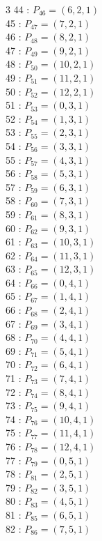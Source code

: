 \documentclass{article}
\begin{document}
{\begin{multicols}{3}
44 : $P_{46}=( 6, 2, 1 )$\\
45 : $P_{47}=( 7, 2, 1 )$\\
46 : $P_{48}=( 8, 2, 1 )$\\
47 : $P_{49}=( 9, 2, 1 )$\\
48 : $P_{50}=( 10, 2, 1 )$\\
49 : $P_{51}=( 11, 2, 1 )$\\
50 : $P_{52}=( 12, 2, 1 )$\\
51 : $P_{53}=( 0, 3, 1 )$\\
52 : $P_{54}=( 1, 3, 1 )$\\
53 : $P_{55}=( 2, 3, 1 )$\\
54 : $P_{56}=( 3, 3, 1 )$\\
55 : $P_{57}=( 4, 3, 1 )$\\
56 : $P_{58}=( 5, 3, 1 )$\\
57 : $P_{59}=( 6, 3, 1 )$\\
58 : $P_{60}=( 7, 3, 1 )$\\
59 : $P_{61}=( 8, 3, 1 )$\\
60 : $P_{62}=( 9, 3, 1 )$\\
61 : $P_{63}=( 10, 3, 1 )$\\
62 : $P_{64}=( 11, 3, 1 )$\\
63 : $P_{65}=( 12, 3, 1 )$\\
64 : $P_{66}=( 0, 4, 1 )$\\
65 : $P_{67}=( 1, 4, 1 )$\\
66 : $P_{68}=( 2, 4, 1 )$\\
67 : $P_{69}=( 3, 4, 1 )$\\
68 : $P_{70}=( 4, 4, 1 )$\\
69 : $P_{71}=( 5, 4, 1 )$\\
70 : $P_{72}=( 6, 4, 1 )$\\
71 : $P_{73}=( 7, 4, 1 )$\\
72 : $P_{74}=( 8, 4, 1 )$\\
73 : $P_{75}=( 9, 4, 1 )$\\
74 : $P_{76}=( 10, 4, 1 )$\\
75 : $P_{77}=( 11, 4, 1 )$\\
76 : $P_{78}=( 12, 4, 1 )$\\
77 : $P_{79}=( 0, 5, 1 )$\\
78 : $P_{81}=( 2, 5, 1 )$\\
79 : $P_{82}=( 3, 5, 1 )$\\
80 : $P_{83}=( 4, 5, 1 )$\\
81 : $P_{85}=( 6, 5, 1 )$\\
82 : $P_{86}=( 7, 5, 1 )$\\

\end{multicols}}
\end{document}

